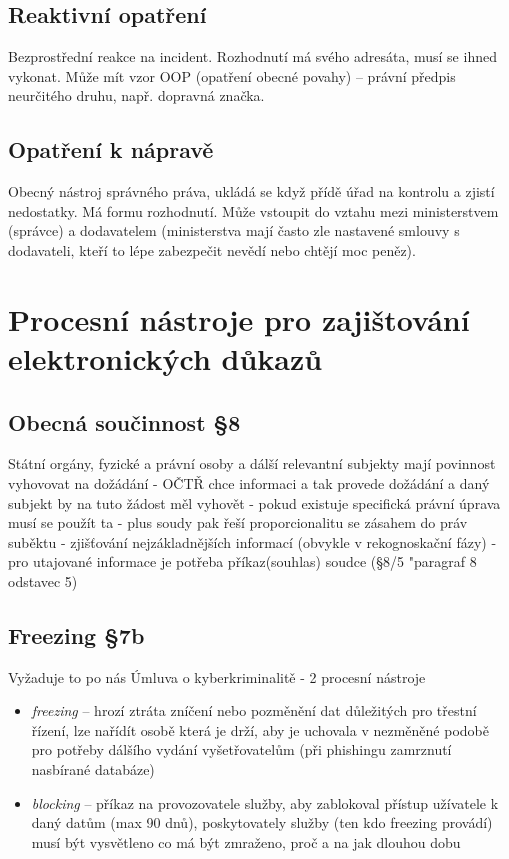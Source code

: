 \subsection*{Reaktivní opatření}
Bezprostřední reakce na incident. Rozhodnutí má svého adresáta, musí se ihned vykonat. Může mít vzor OOP (opatření obecné povahy) -- právní předpis neurčitého druhu, např. dopravná značka.

\subsection*{Opatření k nápravě}
Obecný nástroj správného práva, ukládá se když přídě úřad na kontrolu a zjistí nedostatky. Má formu rozhodnutí. Může vstoupit do vztahu mezi ministerstvem (správce) a dodavatelem (ministerstva mají často zle nastavené smlouvy s dodavateli, kteří to lépe zabezpečit nevědí nebo chtějí moc peněz).

\clearpage
\section{Procesní nástroje pro zajištování elektronických důkazů}

\subsection*{Obecná součinnost §8}
Státní orgány, fyzické a právní osoby a dálší relevantní subjekty mají povinnost vyhovovat na
dožádání - OČTŘ chce informaci a tak provede dožádání a daný subjekt by na tuto žádost měl
vyhovět - pokud existuje specifická právní úprava musí se použít ta - plus soudy pak řeší
proporcionalitu se zásahem do práv suběktu - zjišťování nejzákladnějších informací (obvykle v
rekognoskační fázy) - pro utajované informace je potřeba příkaz(souhlas) soudce (§8/5 "paragraf 8
odstavec 5)
\subsection*{Freezing §7b}
Vyžaduje to po nás Úmluva o kyberkriminalitě - 2 procesní nástroje
\begin{itemize}
    \item \textit{freezing} -- hrozí ztráta zníčení nebo pozměnění dat důležitých pro třestní řízení, lze nařídít osobě která je drží, aby je uchovala v nezměněné podobě pro potřeby dálšího vydání vyšetřovatelům (při phishingu zamrznutí nasbírané databáze)
    \item \textit{blocking} -- příkaz na provozovatele služby, aby zablokoval přístup užívatele k daný datům (max 90 dnů), poskytovately služby (ten kdo freezing provádí) musí být vysvětleno co má být zmraženo, proč a na jak dlouhou dobu
\end{itemize}

